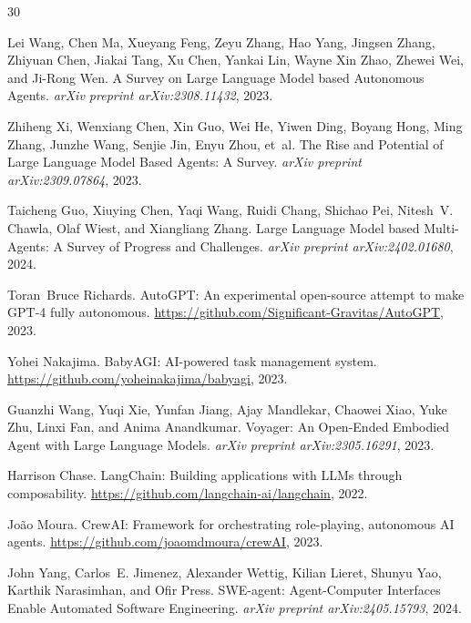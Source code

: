 \documentclass{article}
\begin{document}

\begin{thebibliography}{30}

Lei Wang, Chen Ma, Xueyang Feng, Zeyu Zhang, Hao Yang, Jingsen Zhang, Zhiyuan Chen, Jiakai Tang, Xu Chen, Yankai Lin, Wayne Xin Zhao, Zhewei Wei, and Ji-Rong Wen.
\newblock A Survey on Large Language Model based Autonomous Agents.
\newblock \textit{arXiv preprint arXiv:2308.11432}, 2023.

Zhiheng Xi, Wenxiang Chen, Xin Guo, Wei He, Yiwen Ding, Boyang Hong, Ming Zhang, Junzhe Wang, Senjie Jin, Enyu Zhou, et~al.
\newblock The Rise and Potential of Large Language Model Based Agents: A Survey.
\newblock \textit{arXiv preprint arXiv:2309.07864}, 2023.

Taicheng Guo, Xiuying Chen, Yaqi Wang, Ruidi Chang, Shichao Pei, Nitesh~V. Chawla, Olaf Wiest, and Xiangliang Zhang.
\newblock Large Language Model based Multi-Agents: A Survey of Progress and Challenges.
\newblock \textit{arXiv preprint arXiv:2402.01680}, 2024.

Toran~Bruce Richards.
\newblock AutoGPT: An experimental open-source attempt to make GPT-4 fully autonomous.
\newblock \url{https://github.com/Significant-Gravitas/AutoGPT}, 2023.

Yohei Nakajima.
\newblock BabyAGI: AI-powered task management system.
\newblock \url{https://github.com/yoheinakajima/babyagi}, 2023.

Guanzhi Wang, Yuqi Xie, Yunfan Jiang, Ajay Mandlekar, Chaowei Xiao, Yuke Zhu, Linxi Fan, and Anima Anandkumar.
\newblock Voyager: An Open-Ended Embodied Agent with Large Language Models.
\newblock \textit{arXiv preprint arXiv:2305.16291}, 2023.

Harrison Chase.
\newblock LangChain: Building applications with LLMs through composability.
\newblock \url{https://github.com/langchain-ai/langchain}, 2022.

Jo\~{a}o Moura.
\newblock CrewAI: Framework for orchestrating role-playing, autonomous AI agents.
\newblock \url{https://github.com/joaomdmoura/crewAI}, 2023.

John Yang, Carlos~E. Jimenez, Alexander Wettig, Kilian Lieret, Shunyu Yao, Karthik Narasimhan, and Ofir Press.
\newblock SWE-agent: Agent-Computer Interfaces Enable Automated Software Engineering.
\newblock \textit{arXiv preprint arXiv:2405.15793}, 2024.


\end{thebibliography}
\end{document}
